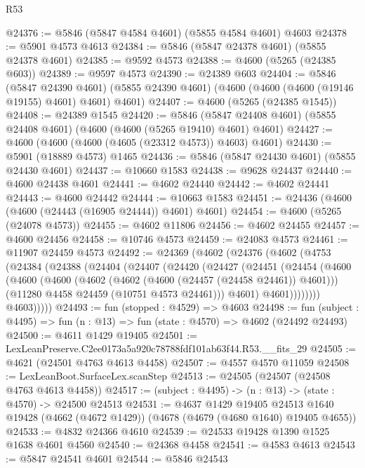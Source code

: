 \begin{lexlean}{R53}
\begin{coremodule}
@24376 := @5846 (@5847 @4584 @4601) (@5855 @4584 @4601) @4603
@24378 := @5901 @4573 @4613
@24384 := @5846 (@5847 @24378 @4601) (@5855 @24378 @4601)
@24385 := @9592 @4573
@24388 := @4600 (@5265 (@24385 @603))
@24389 := @9597 @4573
@24390 := @24389 @603
@24404 := @5846
    (@5847 @24390 @4601)
    (@5855 @24390 @4601)
    (@4600 (@4600 (@4600 (@19146 @19155) @4601) @4601) @4601)
@24407 := @4600 (@5265 (@24385 @1545))
@24408 := @24389 @1545
@24420 := @5846 (@5847 @24408 @4601) (@5855 @24408 @4601) (@4600 (@4600 (@5265 @19410) @4601) @4601)
@24427 := @4600 (@4600 (@4600 (@4605 (@23312 @4573)) @4603) @4601)
@24430 := @5901 (@18889 @4573) @1465
@24436 := @5846 (@5847 @24430 @4601) (@5855 @24430 @4601)
@24437 := @10660 @1583
@24438 := @9628 @24437
@24440 := @4600 @24438 @4601
@24441 := @4602 @24440
@24442 := @4602 @24441
@24443 := @4600 @24442
@24444 := @10663 @1583
@24451 := @24436 (@4600 (@4600 (@24443 (@16905 @24444)) @4601) @4601)
@24454 := @4600 (@5265 (@24078 @4573))
@24455 := @4602 @11806
@24456 := @4602 @24455
@24457 := @4600 @24456
@24458 := @10746 @4573
@24459 := @24083 @4573
@24461 := @11907 @24459 @4573
@24492 := @24369
    (@4602
      (@24376
        (@4602
          (@4753
            (@24384
              (@24388
                (@24404
                  (@24407
                    (@24420
                      (@24427
                        (@24451
                          (@24454
                            (@4600
                              (@4600
                                (@4600
                                  (@4602 (@4602 (@4600 (@24457 (@24458 @24461)) @4601)))
                                  (@11280 @4458 @24459 (@10751 @4573 @24461)))
                                @4601)
                              @4601))))))))
              @4603)))))
@24493 := fun (stopped : @4529) => @4603
@24498 := fun (subject : @4495) => fun (n : @13) => fun (state : @4570) => @4602 (@24492 @24493)
@24500 := @4611 @1429 @19405
@24501 := LexLeanPreserve.C2ee0173a5a920c78788fdf101ab63f44.R53.__fits_29
@24505 := @4621 (@24501 @4763 @4613 @4458)
@24507 := @4557 @4570 @11059
@24508 := LexLeanBoot.SurfaceLex.scanStep
@24513 := @24505 (@24507 (@24508 @4763 @4613 @4458))
@24517 := (subject : @4495) -> (n : @13) -> (state : @4570) -> @24500 @24513
@24531 := @4637
    @1429
    @19405
    @24513
    @1640
    @19428
    (@4662 (@4672 @1429))
    (@4678 (@4679 (@4680 @1640) @19405 @4655))
@24533 := @4832 @24366 @4610
@24539 := @24533 @19428 @1390 @1525 @1638 @4601 @4560
@24540 := @24368 @4458
@24541 := @4583 @4613
@24543 := @5847 @24541 @4601
@24544 := @5846 @24543

\end{coremodule}
\end{lexlean}
